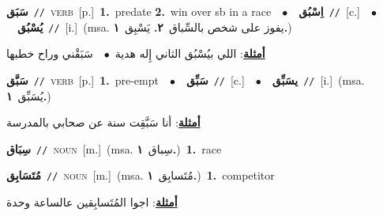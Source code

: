 \documentclass[10pt,a4paper,twoside]{article} %
\begin{document}
\begin{multicols}{2}
{\setlength\topsep{0pt}\textbf{\foreignlanguage{arabic}{سَبَق}}\ {\color{gray}\texttt{//}\color{black}}\ \textsc{verb}\ [p.]\ \textbf{1.}~predate  \textbf{2.}~win over sb in a race\ \ $\bullet$\ \ \setlength\topsep{0pt}\textbf{\foreignlanguage{arabic}{اِسْبُق}}\ {\color{gray}\texttt{//}\color{black}}\ [c.]\ \ $\bullet$\ \ \setlength\topsep{0pt}\textbf{\foreignlanguage{arabic}{يُسْبُق}}\ {\color{gray}\texttt{//}\color{black}}\ [i.]\ \color{gray}(msa. \foreignlanguage{arabic}{يفوز على شخص بالسِّباق}~\foreignlanguage{arabic}{\textbf{٢.}}  \foreignlanguage{arabic}{يَسْبِق}~\foreignlanguage{arabic}{\textbf{١.}})\color{black}\  \begin{flushright}\color{gray}\foreignlanguage{arabic}{\textbf{\underline{\foreignlanguage{arabic}{أمثلة}}}: اللي بيُسْبُق الثاني إِله هدية\ $\bullet$\ \  سَبَقْني وراح خطبها}\end{flushright}\color{black}} \vspace{2mm}

{\setlength\topsep{0pt}\textbf{\foreignlanguage{arabic}{سَبَّق}}\ {\color{gray}\texttt{//}\color{black}}\ \textsc{verb}\ [p.]\ \textbf{1.}~pre-empt\ \ $\bullet$\ \ \setlength\topsep{0pt}\textbf{\foreignlanguage{arabic}{سَبِّق}}\ {\color{gray}\texttt{//}\color{black}}\ [c.]\ \ $\bullet$\ \ \setlength\topsep{0pt}\textbf{\foreignlanguage{arabic}{يسَبِّق}}\ {\color{gray}\texttt{//}\color{black}}\ [i.]\ \color{gray}(msa. \foreignlanguage{arabic}{يُسَبِّق}~\foreignlanguage{arabic}{\textbf{١.}})\color{black}\  \begin{flushright}\color{gray}\foreignlanguage{arabic}{\textbf{\underline{\foreignlanguage{arabic}{أمثلة}}}: أنا سَبَّقِت سنة عن صحابي بالمدرسة}\end{flushright}\color{black}} \vspace{2mm}

{\setlength\topsep{0pt}\textbf{\foreignlanguage{arabic}{سِبَاق}}\ {\color{gray}\texttt{//}\color{black}}\ \textsc{noun}\ [m.]\ \color{gray}(msa. \foreignlanguage{arabic}{سِباق}~\foreignlanguage{arabic}{\textbf{١.}})\color{black}\ \textbf{1.}~race\ } \vspace{2mm}

{\setlength\topsep{0pt}\textbf{\foreignlanguage{arabic}{مُتَسَابِق}}\ {\color{gray}\texttt{//}\color{black}}\ \textsc{noun}\ [m.]\ \color{gray}(msa. \foreignlanguage{arabic}{مُتَسابِق}~\foreignlanguage{arabic}{\textbf{١.}})\color{black}\ \textbf{1.}~competitor\  \begin{flushright}\color{gray}\foreignlanguage{arabic}{\textbf{\underline{\foreignlanguage{arabic}{أمثلة}}}: اجوا المُتَسابِقين عالساعة وحدة}\end{flushright}\color{black}} \vspace{2mm}


\end{multicols}
\end{document}
